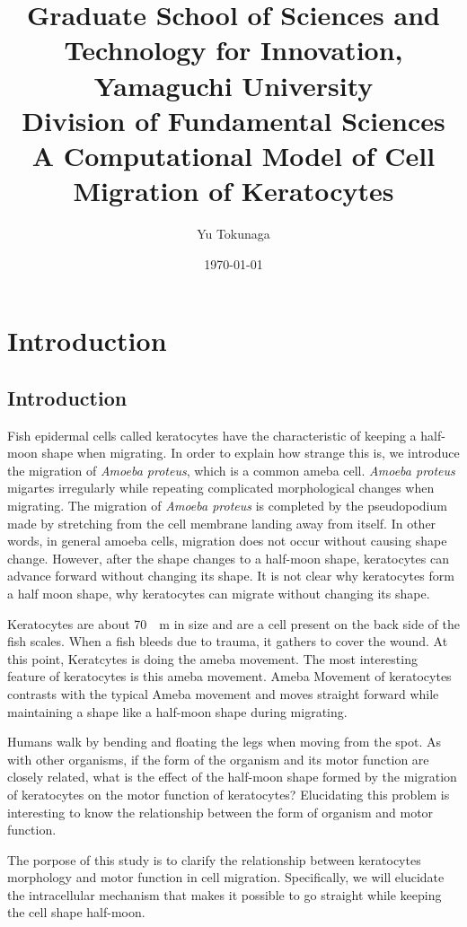 \documentclass[a4paper,12pt]{book}
\title{\Large Graduate School of Sciences and Technology for Innovation, Yamaguchi University\\[1cm]
Division of Fundamental Sciences\\[3cm]
\huge A Computational Model of Cell Migration of Keratocytes\\[5cm]
}
\author{Yu Tokunaga}
\date{\Large \today}
\begin{document}
\maketitle
\setcounter{page}{1}
\tableofcontents
\chapter{Introduction}
\setcounter{page}{1}
\section{Introduction}

Fish epidermal cells called keratocytes have the characteristic of keeping a half-moon shape when migrating. In order to explain how strange this is, we introduce the migration of {\it Amoeba proteus}, which is a common ameba cell. {\it Amoeba proteus} migartes irregularly while repeating complicated morphological changes when migrating. The migration of {\it Amoeba proteus} is completed by the 	pseudopodium made by stretching from the cell membrane landing away from itself. In other words, in general amoeba cells, migration does not occur without causing shape change. However, after the shape changes to a half-moon shape, keratocytes can advance forward without changing its shape. It is not clear why keratocytes form a half moon shape, why keratocytes can migrate without changing its shape.

Keratocytes are about \SI{70}{\mu m} in size and are a cell present on the back side of the fish scales. When a fish bleeds due to trauma, it gathers to cover the wound. At this point, Keratcytes is doing the ameba movement. The most interesting feature of keratocytes is this ameba movement. Ameba Movement of keratocytes  contrasts with the typical Ameba movement and moves straight forward while maintaining a shape like a half-moon shape during migrating.

Humans walk by bending and floating the legs when moving from the spot. As with other organisms, if the form of the organism and its motor function are closely related, what is the effect of the half-moon shape formed by the migration of keratocytes on the motor function of keratocytes? Elucidating this problem is interesting to know the relationship between the form of organism and motor function.

The porpose of this study is to clarify the relationship between keratocytes morphology and motor function in cell migration. Specifically, we will elucidate the intracellular mechanism that makes it possible to go straight while keeping the cell shape half-moon.
\end{document}

